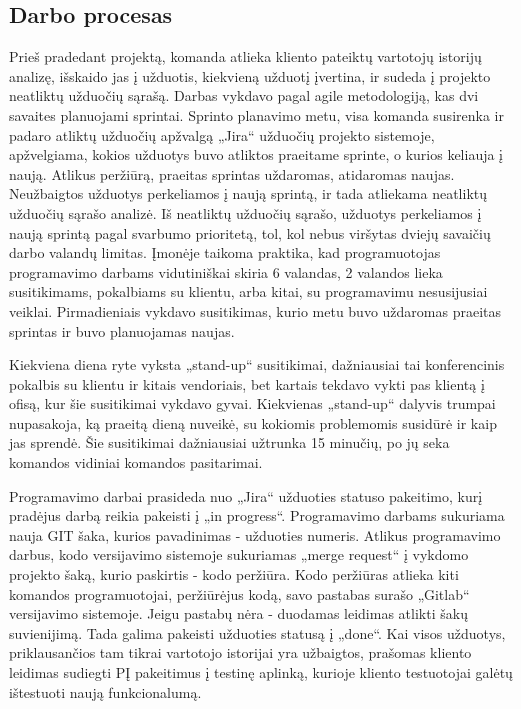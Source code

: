 \subsection{Darbo procesas}
Prieš pradedant projektą, komanda atlieka kliento pateiktų vartotojų istorijų analizę, išskaido jas į užduotis, kiekvieną užduotį įvertina, ir sudeda į projekto neatliktų užduočių sąrašą.
Darbas vykdavo pagal agile metodologiją, kas dvi savaites planuojami sprintai. Sprinto planavimo metu, visa komanda susirenka ir padaro atliktų užduočių apžvalgą „Jira“
užduočių projekto sistemoje, apžvelgiama, kokios užduotys buvo atliktos praeitame sprinte, o kurios keliauja į naują.
Atlikus peržiūrą, praeitas sprintas uždaromas, atidaromas naujas. Neužbaigtos užduotys perkeliamos į naują sprintą, ir tada atliekama neatliktų užduočių sąrašo analizė.
Iš neatliktų užduočių sąrašo, užduotys perkeliamos į naują sprintą pagal svarbumo prioritetą, tol, kol nebus viršytas dviejų savaičių darbo valandų limitas. Įmonėje taikoma praktika,
kad programuotojas programavimo darbams vidutiniškai skiria 6 valandas, 2 valandos lieka susitikimams, pokalbiams su klientu, arba kitai, su programavimu nesusijusiai veiklai.
Pirmadieniais vykdavo susitikimas, kurio metu buvo uždaromas praeitas sprintas ir buvo planuojamas naujas.

Kiekviena diena ryte vyksta „stand-up“ susitikimai, dažniausiai tai konferencinis pokalbis su klientu ir kitais vendoriais, bet kartais tekdavo vykti pas klientą į ofisą, kur šie
susitikimai vykdavo gyvai. Kiekvienas „stand-up“ dalyvis trumpai nupasakoja, ką praeitą dieną nuveikė, su kokiomis problemomis susidūrė ir kaip jas sprendė.
Šie susitikimai dažniausiai užtrunka 15 minučių, po jų seka komandos vidiniai komandos pasitarimai.

Programavimo darbai prasideda nuo „Jira“ užduoties statuso pakeitimo, kurį pradėjus darbą reikia pakeisti į „in progress“. Programavimo darbams sukuriama nauja GIT šaka, kurios pavadinimas
- užduoties numeris. Atlikus programavimo darbus, kodo versijavimo sistemoje
sukuriamas „merge request“ į vykdomo projekto šaką, kurio paskirtis - kodo peržiūra. Kodo peržiūras atlieka kiti komandos programuotojai, peržiūrėjus kodą, savo pastabas surašo
„Gitlab“ versijavimo sistemoje. Jeigu pastabų nėra - duodamas leidimas atlikti šakų suvienijimą. Tada galima pakeisti užduoties statusą į „done“.
Kai visos užduotys, priklausančios tam tikrai vartotojo istorijai yra užbaigtos,
prašomas kliento leidimas sudiegti PĮ pakeitimus į testinę aplinką, kurioje kliento testuotojai galėtų ištestuoti naują funkcionalumą.

